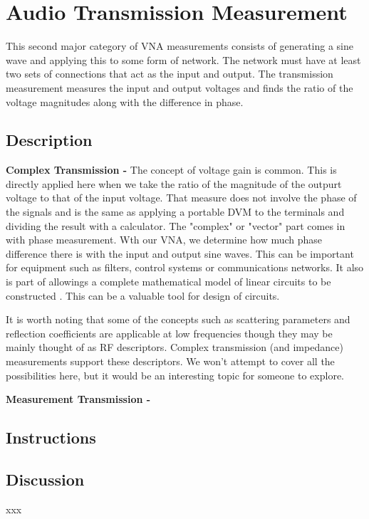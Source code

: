 \section{Audio Transmission Measurement}
This second major category of VNA measurements consists of generating a sine wave and applying this to some form of network.
 The network must have at least two sets of connections that act as the input and output.
The transmission measurement measures the input and output voltages and finds the ratio of the voltage magnitudes along with the difference in phase.
%
\subsection{Description}
\textbf{Complex Transmission - }The concept of voltage gain  is common.  
This is directly applied here when we take the ratio of the magnitude of the outpurt voltage to that of the input voltage.  
That measure does not involve the phase of the signals and is the same as applying a portable DVM to the terminals and dividing the result with a calculator.   
The "complex" or "vector" part comes in with phase measurement.  
Wth our VNA, we determine how much phase difference there is with the input and output sine waves.
This can be important for equipment such as  filters, control systems or communications networks.
It also is part of allowings a complete mathematical model of linear circuits to be constructed .  This can be a valuable tool for design of circuits.

It is worth noting that some of the concepts such as scattering parameters and reflection coefficients are applicable at low frequencies though they may be mainly thought of as RF descriptors.  Complex transmission (and impedance) measurements support these descriptors.  We won't attempt to cover all the possibilities here, but it would be an interesting topic for someone to explore.

\textbf{Measurement Transmission - }

\subsection{Instructions}

\subsection{Discussion}
xxx
